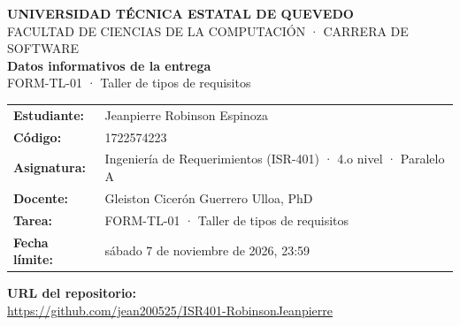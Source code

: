 \documentclass[12pt,a4paper]{article}
\begin{document}
\begin{center}
{\large\bfseries UNIVERSIDAD TÉCNICA ESTATAL DE QUEVEDO}\\[0.2cm]
{\normalsize FACULTAD DE CIENCIAS DE LA COMPUTACIÓN · CARRERA DE SOFTWARE}\\[0.4cm]
{\Large\bfseries Datos informativos de la entrega}\\[0.2cm]
{\large FORM-TL-01 · Taller de tipos de requisitos}\\[0.5cm]
\end{center}

\begin{tabular}{@{}ll@{}}
\textbf{Estudiante:} & Jeanpierre Robinson Espinoza \\
\textbf{Código:} & 1722574223 \\
\textbf{Asignatura:} & Ingeniería de Requerimientos (ISR-401) · 4.o nivel · Paralelo A \\
\textbf{Docente:} & Gleiston Cicerón Guerrero Ulloa, PhD \\
\textbf{Tarea:} & FORM-TL-01 · Taller de tipos de requisitos \\
\textbf{Fecha límite:} & sábado 7 de noviembre de 2026, 23:59 \\
\end{tabular}

\vspace{0.8cm}

\textbf{URL del repositorio:}\\[0.2cm]
\noindent\mbox{\url{https://github.com/jean200525/ISR401-RobinsonJeanpierre}}
\end{document}
